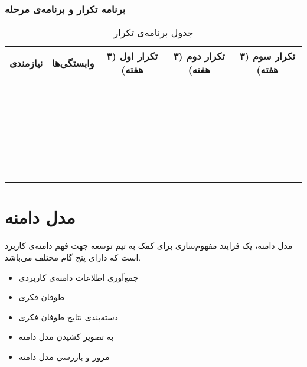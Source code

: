 \documentclass[12pt,svgnames,oneside]{book}
\begin{document}
			\subsection{برنامه تکرار و برنامه‌ی مرحله}
				\begin{center}
					\begin{longtable}{|c|c|c|c|c|}
						\caption{جدول برنامه‌ی تکرار}
						\endfirsthead
						\endhead
						\hline
						نیازمندی & وابستگی‌ها & تکرار اول (۳ هفته) & تکرار دوم  (۳ هفته) & تکرار سوم  (۳ هفته) \\
						\hline
						\hline
& & & & \\ \hline
& & & & \\ \hline
& & & & \\ \hline
& & & & \\ \hline
& & & & \\ \hline
& & & & \\ \hline
& & & & \\ \hline
& & & & \\ \hline
& & & & \\ \hline
& & & & \\ \hline
& & & & \\ \hline
& & & & \\ \hline
& & & & \\ \hline
& & & & \\ \hline
& & & & \\ \hline
& & & & \\ \hline
& & & & \\ \hline
& & & & \\ \hline
& & & & \\ \hline
& & & & \\ \hline
& & & & \\ \hline
& & & & \\ \hline
& & & & \\ \hline
& & & & \\ \hline
& & & & \\ \hline
& & & & \\ \hline
& & & & \\ \hline
& & & & \\ \hline
& & & & \\ \hline
					\end{longtable}
				\end{center}
	
	\chapter{مدل دامنه}
		مدل دامنه، یک فرایند مفهوم‌سازی برای کمک به تیم توسعه جهت فهم دامنه‌ی کاربرد است که دارای پنج گام مختلف می‌باشد.
		\begin{itemize}
			\item جمع‌آوری اطلاعات دامنه‌‌ی کاربردی 
			\item طوفان فکری
			\item دسته‌بندی نتایج طوفان فکری
			\item به تصویر کشیدن مدل دامنه
			\item مرور و بازرسی مدل دامنه
		\end{itemize}
	
\end{document}
